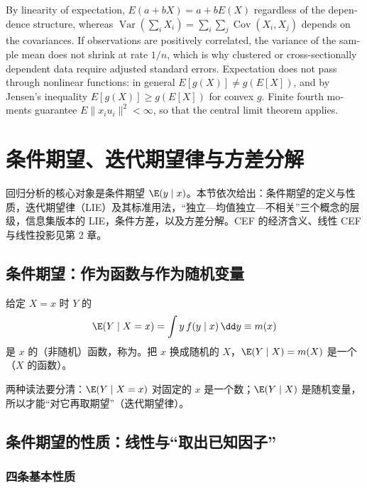 \begin{english}
By linearity of expectation, $E(a+bX)=a+bE(X)$ regardless of the dependence structure, whereas $\operatorname{Var}(\sum_iX_i)=\sum_i\sum_j\operatorname{Cov}(X_i,X_j)$ depends on the covariances. If observations are positively correlated, the variance of the sample mean does not shrink at rate $1/n$, which is why clustered or cross-sectionally dependent data require adjusted standard errors. Expectation does not pass through nonlinear functions: in general $E[g(X)]\neq g(E[X])$, and by Jensen's inequality $E[g(X)]\ge g(E[X])$ for convex $g$. Finite fourth moments guarantee $E\|x_iu_i\|^2<\infty$, so that the central limit theorem applies.
\end{english}

\section{条件期望、迭代期望律与方差分解}\label{sec:U01b-ce}

回归分析的核心对象是条件期望 $\E(y\mid x)$。本节依次给出：条件期望的定义与性质，迭代期望律（LIE）及其标准用法，“独立—均值独立—不相关”三个概念的层级，信息集版本的 LIE，条件方差，以及方差分解。CEF 的经济含义、线性 CEF 与线性投影见第 2 章。

\subsection{条件期望：作为函数与作为随机变量}

\begin{defn}[条件期望]\label{def:U01b-ce}
给定 $X=x$ 时 $Y$ 的
\[
\E(Y\mid X=x)=\int y\,f(y\mid x)\,\dd y\equiv m(x)
\]
是 $x$ 的（非随机）函数，称为。把 $x$ 换成随机的 $X$，$\E(Y\mid X)=m(X)$ 是一个（$X$ 的函数）。
\end{defn}

两种读法要分清：$\E(Y\mid X=x)$ 对固定的 $x$ 是一个数；$\E(Y\mid X)$ 是随机变量，所以才能“对它再取期望”（迭代期望律）。

\subsection{条件期望的性质：线性与“取出已知因子”}

\subsubsection{四条基本性质}

